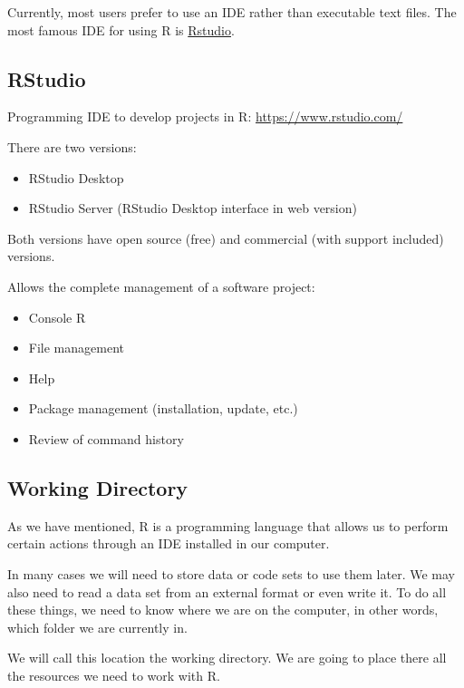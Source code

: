 \documentclass[
]{book}
\providecommand{\tightlist}{%
  \setlength{\itemsep}{0pt}\setlength{\parskip}{0pt}}
\begin{document}
Currently, most users prefer to use an IDE rather than executable text files. The most famous IDE for using R is \href{https://rstudio.com/}{Rstudio}.

\hypertarget{rstudio}{%
\subsection{RStudio}\label{rstudio}}

Programming IDE to develop projects in R: \url{https://www.rstudio.com/}

There are two versions:

\begin{itemize}
\tightlist
\item
  RStudio Desktop
\item
  RStudio Server (RStudio Desktop interface in web version)
\end{itemize}

Both versions have open source (free) and commercial (with support included) versions.

Allows the complete management of a software project:

\begin{itemize}
\tightlist
\item
  Console R
\item
  File management
\item
  Help
\item
  Package management (installation, update, etc.)
\item
  Review of command history
\end{itemize}

\hypertarget{working-directory}{%
\subsection{Working Directory}\label{working-directory}}

As we have mentioned, R is a programming language that allows us to perform certain actions through an IDE installed in our computer.

In many cases we will need to store data or code sets to use them later. We may also need to read a data set from an external format or even write it. To do all these things, we need to know where we are on the computer, in other words, which folder we are currently in.

We will call this location the working directory. We are going to place there all the resources we need to work with R.
\end{document}
